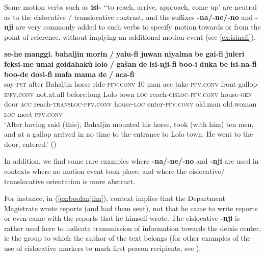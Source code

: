 \documentclass{article}
\newcommand{\ipa}[1]{\textbf{{\phon\mbox{#1}}}} %
\begin{document}
Some motion verbs such as \ipa{isi-} `‘to reach, arrive, approach, come up' are neutral as to the cislocative / translocative contrast, and the suffixes \ipa{-na/-ne/-no} and \ipa{-nji} are very commonly added to such verbs to specify motion towards or from the point of reference, without implying an additional motion event (see \ref{ex:isinafi}).

\begin{exe}
\ex \label{ex:isinafi}
\gll
\ipa{se-he} 	\ipa{manggi.} 	\ipa{bahaljin} 	\ipa{morin} 	\ipa{/} 	\ipa{yalu-fi} 	\ipa{juwan} 	\ipa{niyalma} 	\ipa{be} 	\ipa{gai-fi} 	\ipa{juleri} 	\ipa{feksi-me} 	\ipa{umai} 	\ipa{goidahakû} 	\ipa{lolo} 	\ipa{/} 	\ipa{gašan} 	\ipa{de} 	\ipa{isi-nji-fi} 	\ipa{boo-i} 	\ipa{duka} 	\ipa{be} 	\ipa{isi-na-fi} 	\ipa{boo-de} 	\ipa{dosi-fi} 	\ipa{mafa} 	\ipa{mama} 	\ipa{de} 	\ipa{/} 	\ipa{aca-fi} \\
say-\textsc{pst} after Bahaljin horse { } ride-\textsc{pfv.conv} 10 man acc take-\textsc{pfv.conv} front gallop-\textsc{ipfv.conv} not.at.all before.long Lolo { } town \textsc{loc} reach-\textsc{cisloc-pfv.conv} house-\textsc{gen} door \textsc{acc} reach-\textsc{transloc-pfv.conv} house-\textsc{loc} enter-\textsc{pfv.conv} old.man old.woman \textsc{loc} { } meet-\textsc{pfv.conv} \\
\glt `After having said (this), Bahaljin mounted his horse, took (with him) ten men, and at a gallop arrived in no time to the entrance to Lolo town. He went to the door, entered.' (\citealt[68;3a/96]{jaxontov93nisan})
\end{exe}

In addition, we find some rare examples where  \ipa{-na/-ne/-no} and \ipa{-nji} are used in contexts where no motion event took place, and where the cislocative/ translocative orientation is more abstract. 

For instance, in (\ref{ex:boolanjiha}), context implies that the Department Magistrate wrote reports (and had them sent), not that he came to write reports or even came with the reports that he himself wrote. The cislocative \ipa{-nji} is rather used here to indicate transmission of information towards the deixis center, ie the group to which the author of the text belongs (for other examples of the use of cislocative markers to mark first person recipients,  see \citealt{jacques14inverse}).
\end{document}
